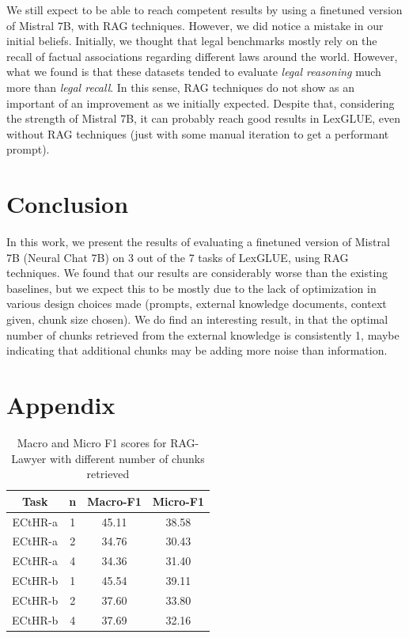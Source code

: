 \documentclass[11pt]{article}
\begin{document}
We still expect to be able to reach competent results by using a finetuned version of Mistral 7B, with RAG techniques. However, we did notice a mistake in our initial beliefs. Initially, we thought that legal benchmarks mostly rely on the recall of factual associations regarding different laws around the world. However, what we found is that these datasets tended to evaluate \textit{legal reasoning} much more than \textit{legal recall}. In this sense, RAG techniques do not show as an important of an improvement as we initially expected. Despite that, considering the strength of Mistral 7B, it can probably reach good results in LexGLUE, even without RAG techniques (just with some manual iteration to get a performant prompt).

\section{Conclusion}
In this work, we present the results of evaluating a finetuned version of Mistral 7B (Neural Chat 7B) on 3 out of the 7 tasks of LexGLUE, using RAG techniques. We found that our results are considerably worse than the existing baselines, but we expect this to be mostly due to the lack of optimization in various design choices made (prompts, external knowledge documents, context given, chunk size chosen). We do find an interesting result, in that the optimal number of chunks retrieved from the external knowledge is consistently 1, maybe indicating that additional chunks may be adding more noise than information.




\appendix

\section{Appendix}


\begin{table}[h]
\centering
\begin{tabular}{|c|c|c|c|}
\hline
Task & n & Macro-F1 & Micro-F1 \\
\hline
ECtHR-a & 1 & 45.11 & 38.58 \\
ECtHR-a & 2 & 34.76 & 30.43 \\
ECtHR-a & 4 & 34.36 & 31.40 \\
ECtHR-b & 1 & 45.54 & 39.11 \\
ECtHR-b & 2 & 37.60 & 33.80 \\
ECtHR-b & 4 & 37.69 & 32.16 \\
\hline
\end{tabular}
\caption{Macro and Micro F1 scores for RAG-Lawyer with different number of chunks retrieved}
\label{tab:my_label}
\end{table}
\end{document}
